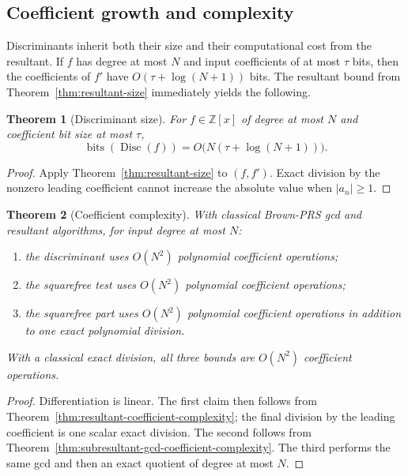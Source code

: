 \documentclass[11pt]{book}
\newtheorem{theorem}{Theorem}[section]
\theoremstyle{definition}
\newcommand{\ZZ}{\mathbb Z}
\newcommand{\bits}{\operatorname{bits}}
\begin{document}
\subsection{Coefficient growth and complexity}

Discriminants inherit both their size and their computational cost from the
resultant.  If $f$ has degree at most $N$ and input coefficients of at most
$\tau$ bits, then the coefficients of $f'$ have
$O(\tau+\log(N+1))$ bits.  The resultant bound from
Theorem~\ref{thm:resultant-size} immediately yields the following.

\begin{theorem}[Discriminant size]\label{thm:discriminant-size}
For $f\in\ZZ[x]$ of degree at most $N$ and coefficient bit size at most
$\tau$,
\[
 \bits(\operatorname{Disc}(f))
 =O\bigl(N(\tau+\log(N+1))\bigr).
\]
\end{theorem}

\begin{proof}
Apply Theorem~\ref{thm:resultant-size} to $(f,f')$.  Exact division by the
nonzero leading coefficient cannot increase the absolute value when
$|a_n|\ge1$.
\end{proof}

\begin{theorem}[Coefficient complexity]\label{thm:disc-squarefree-coefficient-complexity}
With classical Brown-PRS gcd and resultant algorithms, for input degree at
most $N$:
\begin{enumerate}
 \item the discriminant uses $O(N^2)$ polynomial coefficient operations;
 \item the squarefree test uses $O(N^2)$ polynomial coefficient operations;
 \item the squarefree part uses $O(N^2)$ polynomial coefficient operations
 in addition to one exact polynomial division.
\end{enumerate}
With a classical exact division, all three bounds are $O(N^2)$ coefficient
operations.
\end{theorem}

\begin{proof}
Differentiation is linear.  The first claim then follows from
Theorem~\ref{thm:resultant-coefficient-complexity}; the final division by the
leading coefficient is one scalar exact division.  The second follows from
Theorem~\ref{thm:subresultant-gcd-coefficient-complexity}.  The third performs
the same gcd and then an exact quotient of degree at most $N$.
\end{proof}
\end{document}

